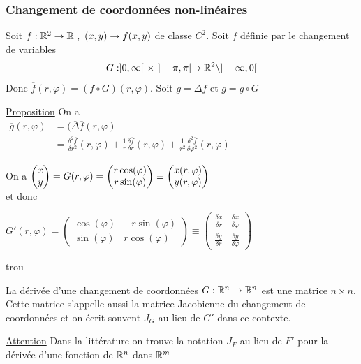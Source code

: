 \documentclass[12pt,a4paper]{article}
\begin{document}
\subsubsection{Changement de coordonnées non-linéaires}
 Soit $f:\mathbb{R}^2 \to \mathbb{R} \ , \ (x,y) \to f(x,y)$ de classe $C^2$. Soit $\overline{f}$ définie par le changement de variables 
\begin{equation*}
	G : ]0,\infty[\ \times\ ]-\pi,\pi[ \to \mathbb{R}^2 \setminus ]-\infty,0[
\end{equation*}
Donc $\overline{f}(r,\varphi) = (f\circ G)(r,\varphi)$. Soit $g = \Delta f$ et $\overline{g} = g\circ G$\\
\begin{boite}
	\uline{Proposition} On a \\
	$\begin{array}{rl}
		\overline{g} (r,\varphi)& = (\overline{\Delta}\overline{f}(r,\varphi)\\
		& = \frac{\delta^2 \overline{f}}{\delta r^2}(r,\varphi) + \frac{1}{r}\frac{\delta \overline{f}}{\delta r}(r,\varphi) + \frac{1}{r^2} \frac{\delta^2 \overline{f}}{\delta \varphi^2}(r,\varphi)
	\end{array}$
\end{boite}
On a $\begin{pmatrix} x \\ y \end{pmatrix} = G(r,\varphi) = \begin{pmatrix} r\cos(\varphi) \\ r\sin(\varphi) \end{pmatrix} \equiv \begin{pmatrix} x(r,\varphi) \\ y(r,\varphi) \end{pmatrix}$\\
et donc 
\begin{boite}
	$G'(r,\varphi) = 
	\begin{pmatrix}
		\cos(\varphi) & -r\sin(\varphi)\\
		\sin(\varphi) & r\cos(\varphi)
	\end{pmatrix} \equiv 
	\begin{pmatrix}
	\frac{\delta x}{\delta r} & \frac{\delta x}{\delta \varphi}\\
	\frac{\delta y}{\delta r} & \frac{\delta y}{\delta \varphi}
	\end{pmatrix}$
\end{boite}
{trou}
\begin{boite}
	 La dérivée d'une changement de coordonnées $G:\mathbb{R}^n \to \mathbb{R}^n$ est une matrice $n\times n$. Cette matrice s'appelle aussi la matrice Jacobienne du changement de coordonnées et on écrit souvent $J_G$ au lieu de $G'$ dans ce contexte.
\end{boite}
\uline{Attention} Dans la littérature on trouve la notation $J_F$ au lieu de $F'$ pour la dérivée d'une fonction de $\mathbb{R}^n$ dans $\mathbb{R}^m$
\end{document}
